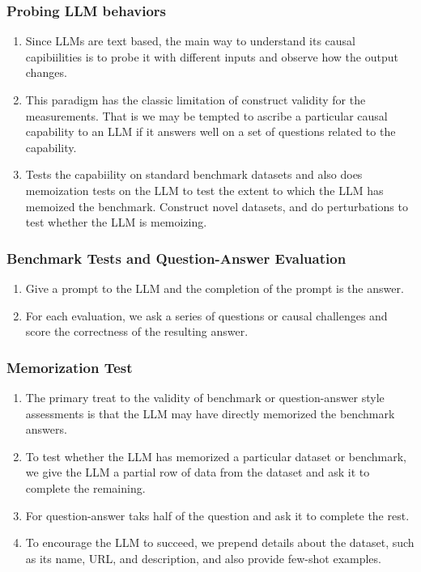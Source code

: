 \documentclass{beamer}
\begin{document}
\begin{frame}
	\frametitle{Probing LLM behaviors}
	\begin{enumerate}
		\item Since LLMs are text based, the main way to understand its causal
			capibiilities is to probe it with different inputs and observe
			how the output changes.
		\item This paradigm has the classic limitation of construct
			validity for the measurements. That is we may be
			tempted to ascribe a particular causal capability to an
			LLM if it answers well on a set of questions related to
			the capability.
		\item Tests the capabiility on standard benchmark datasets and also
			does memoization tests on the LLM to test the extent to which
			the LLM has memoized the benchmark. Construct novel datasets, and
			do perturbations to test whether the LLM is memoizing.
	\end{enumerate}
\end{frame}

\begin{frame}
	\frametitle{Benchmark Tests and Question-Answer Evaluation}
	\begin{enumerate}
		\item Give a prompt to the LLM and the completion of the prompt is 
			the answer.
		\item For each evaluation, we ask a series of questions or causal 
			challenges and score the correctness of the resulting answer.
	\end{enumerate}
\end{frame}

\begin{frame}
	\frametitle{Memorization Test}
	\begin{enumerate}
		\item The primary treat to the validity of benchmark or question-answer
			style assessments is that the LLM may have directly 
			memorized the benchmark answers.
		\item To test whether the LLM has memorized a particular dataset
			or benchmark, we give the LLM a partial row of data from
			the dataset and ask it to complete the remaining.
		\item For question-answer taks half of the question and ask it to 
			complete the rest.
		\item To encourage the LLM to succeed, we prepend details about the
			dataset, such as its name, URL, and description, and also
			provide few-shot examples.
	\end{enumerate}
\end{frame}
\end{document}
